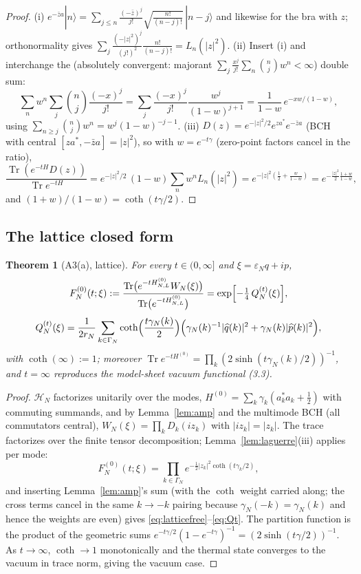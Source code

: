 \documentclass[11pt,a4paper]{article}
\theoremstyle{plain}
\newtheorem{theorem}{Theorem}[section]
\theoremstyle{definition}
\newcommand{\HH}{\mathcal{H}}
\newcommand{\eps}{\varepsilon}
\DeclareMathOperator{\Trace}{Tr}
\DeclareMathOperator{\sh}{sinh}
\DeclareMathOperator{\cth}{coth}
\begin{document}
\begin{proof}
(i) $e^{-\bar za}|n\rangle=\sum_{j\le n}\frac{(-\bar z)^j}{j!}
\sqrt{\tfrac{n!}{(n-j)!}}\,|n-j\rangle$ and likewise for the bra with $z$;
orthonormality gives
$\sum_j\frac{(-|z|^2)^j}{(j!)^2}\frac{n!}{(n-j)!}=L_n(|z|^2)$.
(ii) Insert (i) and interchange the (absolutely convergent: majorant
$\sum_j\frac{x^j}{j!}\sum_n\binom njw^n<\infty$) double sum:
\[
 \sum_{n}w^n\sum_j\binom nj\frac{(-x)^j}{j!}
 =\sum_j\frac{(-x)^j}{j!}\frac{w^j}{(1-w)^{j+1}}
 =\frac1{1-w}\,e^{-xw/(1-w)},
\]
using $\sum_{n\ge j}\binom njw^n=w^j(1-w)^{-j-1}$.
(iii) $D(z)=e^{-|z|^2/2}e^{za^*}e^{-\bar za}$ (BCH with central
$[za^*,-\bar za]=|z|^2$), so with $w=e^{-t\gamma}$ (zero-point factors cancel
in the ratio),
\[
 \frac{\Trace(e^{-tH}D(z))}{\Trace e^{-tH}}
 =e^{-|z|^2/2}\,(1-w)\sum_nw^nL_n(|z|^2)
 =e^{-|z|^2(\frac12+\frac w{1-w})}
 =e^{-\frac{|z|^2}2\frac{1+w}{1-w}},
\]
and $(1+w)/(1-w)=\cth(t\gamma/2)$.
\end{proof}

\subsection{The lattice closed form}

\begin{theorem}[A3(a), lattice]\label{thm:lattice-free}
For every $t\in(0,\infty]$ and $\xi=\eps_Nq+ip$,
\begin{equation}
 F^{(0)}_N(t;\xi):=
 \frac{\Trace\bigl(e^{-tH^{(0)}_{N,L}}W_N(\xi)\bigr)}
      {\Trace\bigl(e^{-tH^{(0)}_{N,L}}\bigr)}
 =\exp\Bigl[-\tfrac14\,Q^{(t)}_N(\xi)\Bigr],
 \label{eq:latticefree}
\end{equation}
\begin{equation}
 Q^{(t)}_N(\xi)=\frac1{2r_N}\sum_{k\in\Gamma_N}
 \cth\Bigl(\frac{t\gamma_N(k)}2\Bigr)
 \Bigl(\gamma_N(k)^{-1}|\widehat q(k)|^2
 +\gamma_N(k)|\widehat p(k)|^2\Bigr),
 \label{eq:Qt}
\end{equation}
with $\cth(\infty):=1$; moreover
$\Trace e^{-tH^{(0)}}=\prod_k(2\sh(t\gamma_N(k)/2))^{-1}$, and $t=\infty$
reproduces the model-sheet vacuum functional (3.3).
\end{theorem}

\begin{proof}
$\HH_N$ factorizes unitarily over the modes,
$H^{(0)}=\sum_k\gamma_k(a_k^*a_k+\tfrac12)$ with commuting summands, and by
Lemma~\ref{lem:amp} and the multimode BCH (all commutators central),
$W_N(\xi)=\prod_kD_k(iz_k)$ with $|iz_k|=|z_k|$. The trace factorizes over the
finite tensor decomposition; Lemma~\ref{lem:laguerre}(iii) applies per mode:
\[
 F^{(0)}_N(t;\xi)=\prod_{k\in\Gamma_N}
 e^{-\frac12|z_k|^2\cth(t\gamma_k/2)} ,
\]
and inserting Lemma~\ref{lem:amp}'s sum (with the $\cth$ weight carried along;
the cross terms cancel in the same $k\to-k$ pairing because
$\gamma_N(-k)=\gamma_N(k)$ and hence the weights are even) gives
\eqref{eq:latticefree}--\eqref{eq:Qt}. The partition function is the product
of the geometric sums $e^{-t\gamma/2}(1-e^{-t\gamma})^{-1}
=(2\sh(t\gamma/2))^{-1}$. As $t\to\infty$, $\cth\to1$ monotonically and the
thermal state converges to the vacuum in trace norm, giving the vacuum case.
\end{proof}
\end{document}
